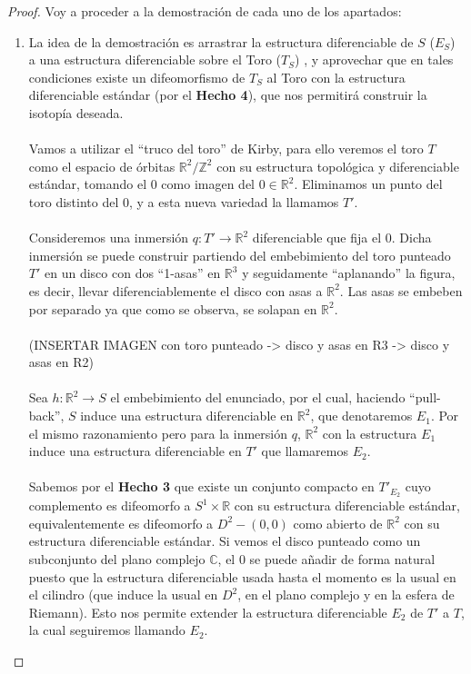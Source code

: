 \begin{proof}
	Voy a proceder a la demostración de cada uno de los apartados: \\
	\begin{enumerate}
		\item La idea de la demostración es arrastrar la estructura diferenciable de $S$ ($E_S$) a una estructura diferenciable sobre el Toro ($T_S$) , y aprovechar que en tales condiciones existe un difeomorfismo de $T_S$ al Toro con la estructura diferenciable estándar (por el \textbf{Hecho 4}), que nos permitirá construir la isotopía deseada.\\
			\\ Vamos a utilizar el ``truco del toro'' de Kirby, para ello veremos el toro $T$ como el espacio de órbitas $\mathbb{R}^2/\mathbb{Z}^2$ con su estructura topológica y diferenciable estándar, tomando el $0$ como imagen del $0\in \mathbb{R}^2$. Eliminamos un punto del toro distinto del $0$, y a esta nueva variedad la llamamos $T'$. \\
			\\ Consideremos una inmersión $q: T' \rightarrow \mathbb{R}^2$ diferenciable que fija el $0$. Dicha inmersión se puede construir partiendo del embebimiento del toro punteado $T'$ en un disco con dos ``1-asas'' en $\mathbb{R}^3$ y seguidamente ``aplanando'' la figura, es decir, llevar diferenciablemente el disco con asas a $\mathbb{R}^2$. Las asas se embeben por separado ya que como se observa, se solapan en $\mathbb{R}^2$.\\
			\\(INSERTAR IMAGEN con toro punteado -> disco y asas en R3 -> disco y asas en R2)\\
			\\ Sea $h:\mathbb{R}^2 \rightarrow S$ el embebimiento del enunciado, por el cual, haciendo ``pull-back'', $S$ induce una estructura diferenciable en $\mathbb{R}^2$, que denotaremos $E_1$. Por el mismo razonamiento pero para la inmersión $q$, $\mathbb{R}^2$ con la estructura $E_1$ induce una estructura diferenciable en $T'$ que llamaremos $E_2$.\\
			\\ Sabemos por el \textbf{Hecho 3} que existe un conjunto compacto en $T'_{E_2}$ cuyo complemento es difeomorfo a $S^1\times \mathbb{R}$ con su estructura diferenciable estándar, equivalentemente es difeomorfo a $D^2 - {(0,0)}$ como abierto de $\mathbb{R}^2$ con su estructura diferenciable estándar. Si vemos el disco punteado como un subconjunto del plano complejo $\mathbb{C}$, el $0$ se puede añadir de forma natural puesto que la estructura diferenciable usada hasta el momento es la usual en el cilindro (que induce la usual en $D^2$, en el plano complejo y en la esfera de Riemann). Esto nos permite extender la estructura diferenciable $E_2$ de $T'$ a $T$, la cual seguiremos llamando $E_2$.\\

\end{enumerate}
\end{proof}
